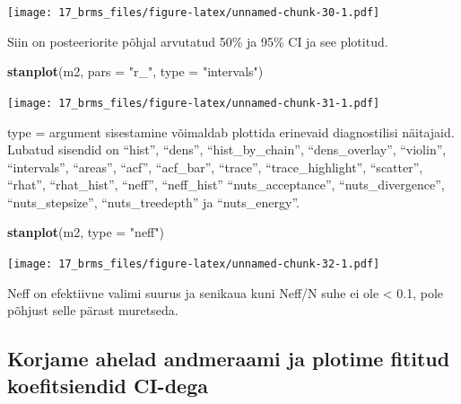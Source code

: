 \documentclass[]{book}
\newenvironment{Shaded}{\begin{snugshade}}{\end{snugshade}}
\newcommand{\KeywordTok}[1]{\textcolor[rgb]{0.13,0.29,0.53}{\textbf{#1}}}
\newcommand{\DataTypeTok}[1]{\textcolor[rgb]{0.13,0.29,0.53}{#1}}
\newcommand{\StringTok}[1]{\textcolor[rgb]{0.31,0.60,0.02}{#1}}
\newcommand{\OperatorTok}[1]{\textcolor[rgb]{0.81,0.36,0.00}{\textbf{#1}}}
\newcommand{\NormalTok}[1]{#1}
\begin{document}
\begin{Shaded}
\end{Shaded}

\texttt{[image: 17\_brms\_files/figure-latex/unnamed-chunk-30-1.pdf]}

Siin on posteeriorite põhjal arvutatud 50\% ja 95\% CI ja see plotitud.

\begin{Shaded}
\begin{Highlighting}[]
\KeywordTok{stanplot}\NormalTok{(m2, }\DataTypeTok{pars =} \StringTok{"r_"}\NormalTok{, }\DataTypeTok{type =} \StringTok{"intervals"}\NormalTok{)}
\end{Highlighting}
\end{Shaded}

\texttt{[image: 17\_brms\_files/figure-latex/unnamed-chunk-31-1.pdf]}

type = argument sisestamine võimaldab plottida erinevaid diagnostilisi
näitajaid. Lubatud sisendid on ``hist'', ``dens'', ``hist\_by\_chain'',
``dens\_overlay'', ``violin'', ``intervals'', ``areas'', ``acf'',
``acf\_bar'', ``trace'', ``trace\_highlight'', ``scatter'', ``rhat'',
``rhat\_hist'', ``neff'', ``neff\_hist'' ``nuts\_acceptance'',
``nuts\_divergence'', ``nuts\_stepsize'', ``nuts\_treedepth'' ja
``nuts\_energy''.

\begin{Shaded}
\begin{Highlighting}[]
\KeywordTok{stanplot}\NormalTok{(m2, }\DataTypeTok{type =} \StringTok{"neff"}\NormalTok{)}
\end{Highlighting}
\end{Shaded}

\texttt{[image: 17\_brms\_files/figure-latex/unnamed-chunk-32-1.pdf]}

Neff on efektiivne valimi suurus ja senikaua kuni Neff/N suhe ei ole
\textless{} 0.1, pole põhjust selle pärast muretseda.

\subsection{Korjame ahelad andmeraami ja plotime fititud koefitsiendid
CI-dega}\label{korjame-ahelad-andmeraami-ja-plotime-fititud-koefitsiendid-ci-dega}
\end{document}
